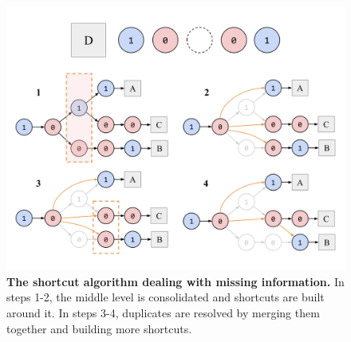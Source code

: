 \begin{figure}[h]
\centering
\includegraphics[width=\linewidth]{img/algo-diagram.png}
\caption{\textbf{The shortcut algorithm dealing with missing information.} In steps 1-2, the middle level is consolidated and shortcuts are built around it. In steps 3-4, duplicates are resolved by merging them together and building more shortcuts.}
\label{fig:algo-diagram}
\end{figure}
